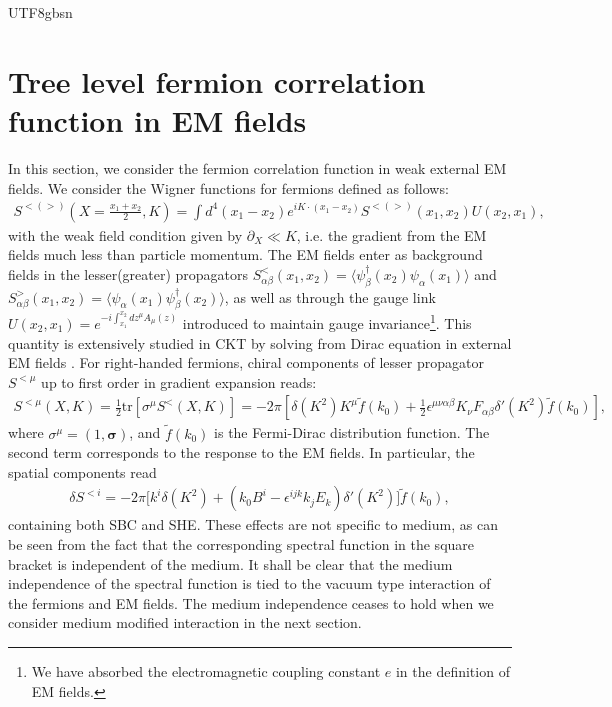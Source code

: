 \documentclass[11pt]{article}\def\baselinestretch{1.4}
\def\d{{\delta}}
\def\e{{\epsilon}}
\def\a{{\alpha}}
\def\b{{\beta}}
\def\p{{\pi}}
\def\m{{\mu}}
\def\s{{\sigma}}
\newcommand{\pd}{{\partial}}
\newcommand{\tr}{\text{tr}}
\begin{document}
\begin{CJK}{UTF8}{gbsn}
\section{Tree level fermion correlation function in EM fields}\label{sec_2}

In this section, we consider the fermion correlation function in weak external EM fields. %
We consider the Wigner functions for fermions defined as follows:
\begin{align}
    S^{<(>)}(X=\frac{x_1+x_2}{2}, K)= \int d^4(x_1-x_2) e^{i K \cdot (x_1-x_2)}S^{<(>)}(x_1,x_2)U(x_2,x_1),
\end{align}
with the weak field condition given by $\pd_X\ll K$, i.e. the gradient from the EM fields much less than particle momentum. The EM fields enter as background fields in the lesser(greater) propagators $S_{\a\b}^{<}(x_1,x_2)=\langle \psi^{\dagger} _\b(x_2)\psi_\a(x_1) \rangle$ and $S_{\a\b}^{>}(x_1,x_2)=\langle \psi_\a(x_1)\psi^{\dagger}_\b (x_2) \rangle$, as well as through the gauge link $U(x_2,x_1)=e^{-i\int_{x_1}^{x_2} dz^\m A_\m(z)}$ introduced to maintain gauge invariance\footnote{We have absorbed the electromagnetic coupling constant $e$ in the definition of EM fields.}. This quantity is extensively studied in CKT by solving from Dirac equation in external EM fields \cite{Hidaka:2016yjf, Hidaka:2017auj}. For right-handed fermions, chiral components of lesser propagator $S^{<\mu}$ up to first order in gradient expansion reads:
\begin{align}\label{Sless_CKT}
    S^{<\mu }(X, K)=\frac{1}{2}\tr[\s^\m S^<(X, K)] = -2\pi \left[\delta (K^2)K^\mu \tilde{f}(k_0) + \frac{1}{2}\epsilon^{\mu \nu \alpha \beta }K_\nu F_{\alpha \beta }\delta '(K^2) \tilde{f}(k_0) \right],
\end{align}
where $\sigma^\mu=(1,\boldsymbol{\sigma})$, and $\tilde{f}(k_0)$ is the Fermi-Dirac distribution function. The second term corresponds to the response to 
the EM fields. In particular, the spatial components read
\begin{align}\label{CKT_pol}
    \d S^{<i}=-2\p \big[k^i\d(K^2)+(k_0B^i-\e^{ijk}k_jE_k)\d'(K^2)\big]\tilde{f}(k_0),
\end{align}
containing both SBC and SHE. These effects are not specific to medium, as can be seen from the fact that the corresponding spectral function in the square bracket is independent of the medium. It shall be clear that the medium independence of the spectral function is tied to the vacuum type interaction of the fermions and EM fields. The medium independence ceases to hold when we consider medium modified interaction in the next section.


\end{CJK}
\end{document}
